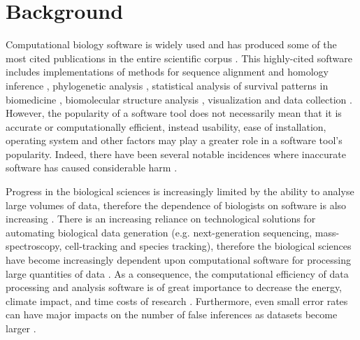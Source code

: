 \documentclass[fleqn,10pt]{SelfArx} %
\begin{document}
\section*{Background}
Computational biology software is widely used and has produced some of
the most cited publications in the entire scientific corpus
\cite{Perez-Iratxeta2007-lv,Van_Noorden2014-kc,Wren2016-xy}. This
highly-cited software includes implementations of methods for sequence
alignment and homology inference
\cite{Altschul1990-ht,Thompson1994-eu,Thompson1997-rl,Altschul1997-ga},
phylogenetic analysis
\cite{Felsenstein1985-lj,Saitou1987-zl,Posada1998-qq,Ronquist2003-yh,Tamura2007-ei},
statistical analysis of survival patterns in biomedicine
\cite{Kaplan1958-ju,Cox1972-nu}, biomolecular structure analysis
\cite{Sheldrick1990-kc,Sheldrick2008-xy,Jones1991-ik,Laskowski1993-vi,Otwinowski1997-xj},
visualization and data collection
\cite{Kraulis1991-lt,Berman2000-to}. However, the popularity of a
software tool does not necessarily mean that it is accurate or
computationally efficient, instead usability, ease of installation,
operating system and other factors may play a greater role in a software
tool's popularity. Indeed, there have been several notable incidences where
inaccurate software has caused considerable harm
\cite{leveson1993investigation,cummings2020regulating,Herkert:2020}.

Progress in the biological sciences is increasingly limited by the
ability to analyse large volumes of data, therefore the
dependence of biologists on software is also increasing
\cite{Marx2013-zi}. There is an increasing reliance on technological
solutions for automating biological data generation
(e.g. next-generation sequencing, mass-spectroscopy, cell-tracking and
species tracking), therefore the biological sciences have become
increasingly dependent upon computational software for processing
large quantities of data \cite{Marx2013-zi}. As a consequence, the
computational efficiency of data processing and analysis software is
of great importance to decrease the energy, climate impact, and time costs of research
\cite{Gombiner2011-md}. Furthermore, even small error rates can have
major impacts on the number of false inferences as datasets become
larger \cite{Storey2003-cv}.
\end{document}

